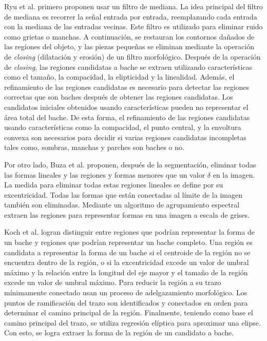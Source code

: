 		Ryu et al. primero proponen usar un filtro de mediana. La idea principal del filtro de mediana es recorrer la señal 
		entrada por entrada, reemplazando cada entrada con la mediana de las entradas vecinas. Este filtro es utilizado para eliminar ruido como grietas o manchas. 
		A continuación, se restauran los contornos dañados de las regiones del objeto, y las piezas pequeñas se eliminan mediante la operación de \emph{closing}
		(dilatación y erosión) de un filtro morfológico. Después de la operación de \emph{closing}, las regiones candidatas a bache se extraen utilizando 
		características como el tamaño, la compacidad, la elipticidad y la linealidad. Además, el refinamiento de las regiones candidatas es necesario para
		detectar las regiones correctas que son baches después de obtener las regiones candidatas. Los candidatos iniciales obtenidos usando características
		pueden no representar el área total del bache. De esta forma, el refinamiento de las regiones candidatas usando características como la compacidad,
		el punto central, y la envoltura convexa son necesarios para decidir si varias regiones candidatas incompletas tales como, sombras, manchas y
		parches son baches o no.

		Por otro lado, Buza et al. proponen, después de la segmentación, eliminar todas las formas lineales  y las regiones y
		formas menores que un valor $\delta$ en la imagen. La medida para eliminar todas estas regiones lineales se define por su excentricidad. Todas 
		las formas que están conectadas al límite de la imagen también son eliminadas. Mediante un algoritmo de agrupamiento espectral extraen 
		las regiones para representar formas en una imagen a escala de grises. 

		Koch et al. logran distinguir entre regiones que podrían representar la forma de un bache y 
		regiones que podrían representar un bache completo. Una región es candidata a representar la forma de un bache si 
		el centroide de la región no se encuentra dentro de la región, o si la excentricidad excede un valor de umbral 
		máximo y la relación entre la longitud del eje mayor y el tamaño de la región excede un valor de umbral máximo. 
		Para reducir la región a su trazo  mínimamente conectado usan un proceso de adelgazamiento morfológico. Los puntos de 
		ramificación del trazo son identificados y conectados en orden para determinar el camino principal de la región. Finalmente, 
		teniendo como base el camino principal del trazo, se utiliza regresión elíptica para aproximar una elipse. Con esto, se logra 
		extraer la forma de la región de un candidato a bache.

